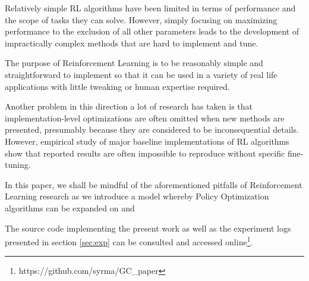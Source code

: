 Relatively simple RL algorithms have been limited in terms of performance and the scope of tasks they can solve. However, simply focusing on maximizing performance to the exclusion of all other parameters leads to the development of impractically complex methods that are hard to implement and tune.%

The purpose of Reinforcement Learning is to be reasonably simple and straightforward to implement so that it can be used in a variety of real life applications with little tweaking or human expertise required.

Another problem in this direction a lot of research has taken is that implementation-level optimizations are often omitted when new methods are presented, presumably because they are considered to be inconsequential details. However, empirical study of  major baseline implementations of RL algorithms show that reported results are often impossible to reproduce without specific fine-tuning\cite{henderson2018deep}\cite{islam2017reproducibility}\cite{andrychowicz2021matters}\cite{dossa2021empirical}.


In this paper, we shall be mindful of the aforementioned pitfalls of Reinforcement Learning research as we introduce a model whereby Policy Optimization algorithms can be expanded on and 

The source code implementing the present work as well as the experiment logs presented in section \ref{sec:exp} can be consulted and accessed online\footnote{https://github.com/syrma/GC\_paper}.
